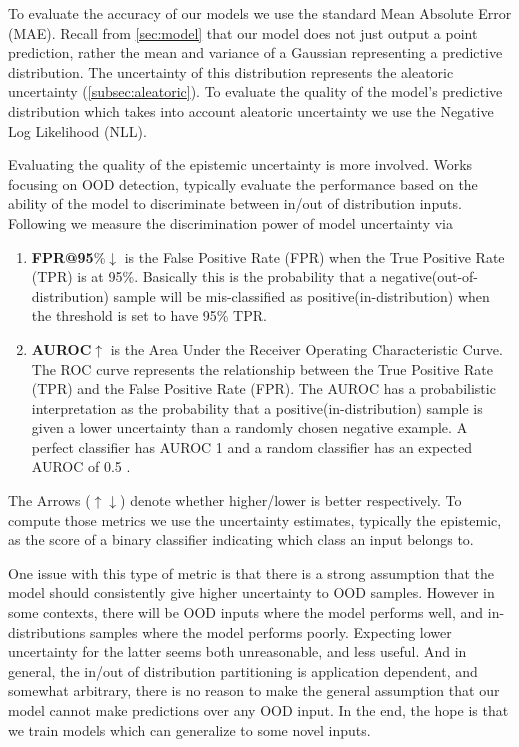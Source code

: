 \documentclass[../main.tex]{subfiles}
\begin{document}
To evaluate the accuracy of our models we use the standard Mean Absolute Error (MAE). Recall from \cref{sec:model} that our model does not just output a point prediction, rather the mean and variance of a Gaussian representing a predictive distribution. The uncertainty of this distribution represents the aleatoric uncertainty (\ref{subsec:aleatoric}). 
To evaluate the quality of the model's predictive distribution which takes into account aleatoric uncertainty we use the Negative Log Likelihood (NLL). 


Evaluating the quality of the epistemic uncertainty is more involved. Works~\citep{liang2017enhancing, hein2019relu, lee2017training} focusing on OOD detection, typically evaluate the performance based on the ability of the model to discriminate between in/out of distribution inputs. Following \cite{liang2017enhancing} we measure the discrimination power of model uncertainty via 
\begin{enumerate}
    \item \textbf{FPR@95}\%$\downarrow$ is the False Positive Rate (FPR) when the True Positive Rate (TPR) is at 95\%. Basically this is the probability that a negative(out-of-distribution) sample will be mis-classified as positive(in-distribution) when the threshold is set to have 95\% TPR.   

    \item \textbf{AUROC}$\uparrow$ is the Area Under the Receiver Operating Characteristic Curve. The ROC curve represents the relationship between the True Positive Rate (TPR) and the False Positive Rate (FPR). The AUROC has a probabilistic interpretation as the probability that a positive(in-distribution) sample is given a lower uncertainty than a randomly chosen negative example. A perfect classifier has AUROC  1 and a random classifier has an expected AUROC of 0.5 . 
\end{enumerate}{}
The Arrows ($\uparrow \downarrow$) denote whether higher/lower is better respectively. To compute those metrics we use the uncertainty estimates, typically the epistemic, as the score of a binary classifier indicating which class an input belongs to. 

One issue with this type of metric is that there is a strong assumption that the model should consistently give higher uncertainty to OOD samples. However in some contexts, there will be OOD inputs where the model performs well, and in-distributions samples where the model performs poorly. Expecting lower uncertainty for the latter seems both unreasonable, and less useful. And in general, the in/out of distribution partitioning is application dependent, and somewhat arbitrary, there is no reason to make the general assumption that our model cannot make predictions over any OOD input. In the end, the hope is that we train models which can generalize to some novel inputs. 
\end{document}
